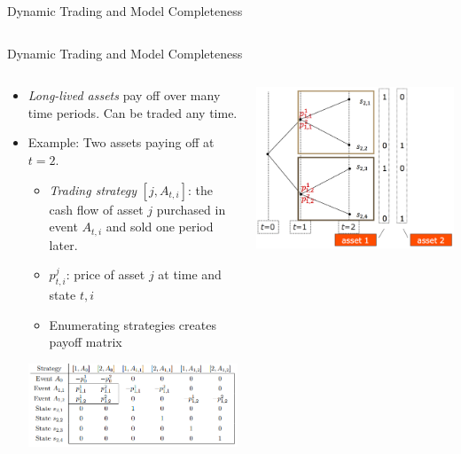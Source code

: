 \documentclass[aspectratio=1610]{beamer}
\begin{document}
\begin{frame}{Dynamic Trading and Model Completeness}
\begin{columns}
\begin{column}{0.3\textwidth}
\end{column}
\end{columns}
\end{frame}

\begin{frame}{Dynamic Trading and Model Completeness}
\begin{columns}
\begin{column}{0.6\textwidth}
  \begin{itemize}
    \item {\em Long-lived assets} pay off over many time periods. Can be traded any time.
    \item Example: Two assets paying off at $t=2$.
    \begin{itemize}
      \item {\em Trading strategy} $[j,A_{t,i}]$: the cash flow of asset $j$ purchased in event $A_{t,i}$ and sold one period later.
      \item $p^j_{t,i}$: price of asset $j$ at time and state $t,i$
      \item Enumerating strategies creates payoff matrix
    \end{itemize}
    \vspace{1ex}
    \includegraphics[width=.85\textwidth]{images/trading-strategy.PNG}
  \end{itemize}
\end{column}
\begin{column}{0.38\textwidth}
  \includegraphics[width=\textwidth]{images/long-lived.PNG}
\end{column}
\end{columns}
\end{frame}
\end{document}
